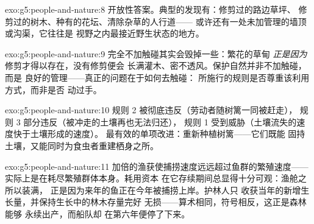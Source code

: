 \begin{solution}{exo:g5:people-and-nature:8}
开放性答案。典型的发现有：修剪过的路边草坪、
修剪过的树木、种有的花坛、清除杂草的人行道——
或许还有一处未加管理的墙顶或沟渠，它往往是
视野之内最接近野生状态的地方。
\end{solution}

\begin{solution}{exo:g5:people-and-nature:9}
完全不加触碰其实会毁掉一些：繁花的草甸
\emph{正是因为}修剪才得以存在，没有修剪便会
长满灌木、密不透风。保护自然并非不加触碰，而是
良好的管理——真正的问题在于如何去触碰：
所施行的规则是否尊重该利用方式，而非是否
动过手。
\end{solution}

\begin{solution}{exo:g5:people-and-nature:10}
规则 2 被彻底违反（劳动者随树篱一同被赶走），
规则 3 部分违反（被冲走的土壤再也无法归还），
规则 1 受到威胁（土壤流失的速度快于土壤形成的速度）。
最有效的单项改进：重新种植树篱——它们既能
固持土壤，又能同时为食虫者重建栖身之所。
\end{solution}

\begin{solution}{exo:g5:people-and-nature:11}
加倍的渔获使捕捞速度远远超过鱼群的繁殖速度——
实际上是在耗尽繁殖群体本身。耗用资本
在它存续期间总显得十分可观：渔舱之所以装满，
正是因为来年的鱼正在今年被捕捞上岸。护林人只
收获当年的新增生长量，并保持生长中的林木存量完好
无损——算术相同，符号相反，这正是森林能够
永续出产，而船队却
在第六年便停了下来。
\end{solution}

